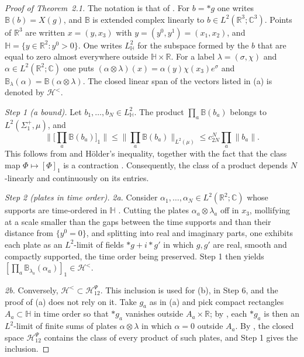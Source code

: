 \documentclass[11pt,letterpaper,reqno]{amsart}
\theoremstyle{definition}
\begin{document}
\begin{proof}[Proof of Theorem~2.1]
The notation is that of \cite[Definitions~14.1 and~14.5]{QEDII}.
For $b=\ast g$ one writes $\mathbb B(b)=X(g)$, and $\mathbb B$ is extended complex linearly to $b\in L^2(\mathbb R^3;\mathbb C^3)$.
Points of $\mathbb R^3$ are written $x=(y,x_3)$ with $y=(y^0,y^1)=(x_1,x_2)$, and $\mathbb H=\{y\in\mathbb R^2:y^0>0\}$.
One writes $L^2_{\mathbb H}$ for the subspace formed by the $b$ that are equal to zero almost everywhere outside $\mathbb H\times\mathbb R$.
For a label $\lambda=(\sigma,\chi)$ and $\alpha\in L^2(\mathbb R^2;\mathbb C)$ one puts $(\alpha\otimes\lambda)(x)=\alpha(y)\chi(x_3)e^\sigma$ and $\mathbb B_\lambda(\alpha)=\mathbb B(\alpha\otimes\lambda)$.
The closed linear span of the vectors listed in (a) is denoted by $\mathcal H^{<}$.

\emph{Step 1 (a bound).}
Let $b_1,\dots,b_N\in L^2_{\mathbb H}$.
The product $\prod_a\mathbb B(b_a)$ belongs to $L^2(\Sigma_1^+,\mu)$, and
\begin{equation*}
\Big\|\Big[\prod_a\mathbb B(b_a)\Big]_1\Big\|\le\Big\|\prod_a\mathbb B(b_a)\Big\|_{L^2(\mu)}\le c_{2N}^N\prod_a\|b_a\|.
\end{equation*}
This follows from \cite[Lemma~14.3\,(a)]{QEDII} and H\"older's inequality, together with the fact that the class map $\Phi\mapsto[\Phi]_1$ is a contraction \cite[Proposition~8.19\,(i)]{QEDI}.
Consequently, the class of a product depends $N$-linearly and continuously on its entries.

\emph{Step 2 (plates in time order).}
\emph{2a.} Consider $\alpha_1,\dots,\alpha_N\in L^2(\mathbb R^2;\mathbb C)$ whose supports are time-ordered in $\mathbb H$ \cite[Definition~14.21]{QEDII}.
Cutting the plates $\alpha_a\otimes\lambda_a$ off in $x_3$, mollifying at a scale smaller than the gaps between the time supports and than their distance from $\{y^0=0\}$, and splitting into real and imaginary parts, one exhibits each plate as an $L^2$-limit of fields $\ast g+i\ast g'$ in which $g,g'$ are real, smooth and compactly supported, the time order being preserved.
Step 1 then yields $[\prod_a\mathbb B_{\lambda_a}(\alpha_a)]_1\in\mathcal H^{<}$.

\emph{2b.} Conversely, $\mathcal H^{<}\subset\mathcal H^{\Psi}_{12}$.
This inclusion is used for (b), in Step 6, and the proof of (a) does not rely on it.
Take $g_a$ as in (a) and pick compact rectangles $A_a\subset\mathbb H$ in time order so that $\ast g_a$ vanishes outside $A_a\times\mathbb R$; by \cite[Lemma~14.8\,(a)]{QEDII}, each $\ast g_a$ is then an $L^2$-limit of finite sums of plates $\alpha\otimes\lambda$ in which $\alpha=0$ outside $A_a$.
By \cite[Proposition~14.47\,(c)]{QEDII}, the closed space $\mathcal H^{\Psi}_{12}$ contains the class of every product of such plates, and Step 1 gives the inclusion.


\end{proof}
\end{document}
